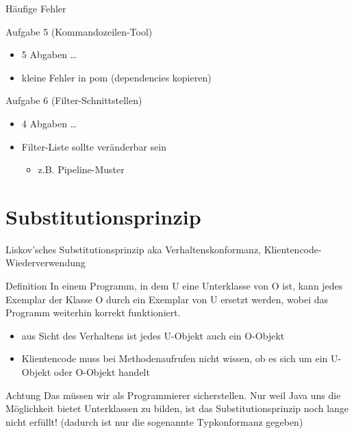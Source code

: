 \documentclass[18pt]{beamer}
\begin{document}
\begin{frame}{Häufige Fehler}
	\begin{block}{Aufgabe 5 (Kommandozeilen-Tool)}
	\begin{itemize}
		\item 5 Abgaben \dots
		\item kleine Fehler in pom (dependencies kopieren)
	\end{itemize}
\end{block}

\pause

\begin{block}{Aufgabe 6 (Filter-Schnittstellen)}
	\begin{itemize}
		\item 4 Abgaben \dots
		\item Filter-Liste sollte veränderbar sein
		\begin{itemize}
			\item z.B. Pipeline-Muster
		\end{itemize}
	\end{itemize}
\end{block}
\end{frame}


\section{Substitutionsprinzip}
\begin{frame}{Liskov'sches Substitutionsprinzip}
	\small aka Verhaltenskonformanz, Klientencode-Wiederverwendung
	\begin{block}{Definition}
		In einem Programm, in dem U eine Unterklasse
		von O ist, kann jedes Exemplar der Klasse O
		durch ein Exemplar von U ersetzt werden, wobei
		das Programm weiterhin korrekt funktioniert.
	\end{block}
	\pause
	\begin{itemize}
		\item aus Sicht des Verhaltens ist jedes U-Objekt auch ein O-Objekt
		\item Klientencode muss bei Methodenaufrufen nicht wissen, ob es sich um ein U-Objekt oder O-Objekt handelt
	\end{itemize}
	\pause
	\begin{alertblock}{Achtung}
		Das müssen wir als Programmierer sicherstellen. Nur weil Java uns die Möglichkeit bietet Unterklassen zu bilden, ist das Substitutionsprinzip noch lange nicht erfüllt! (dadurch ist nur die sogenannte Typkonformanz gegeben)
	\end{alertblock}
\end{frame}
\end{document}
